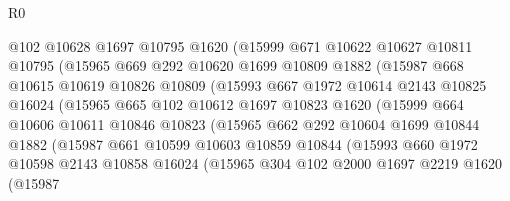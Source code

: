 \begin{lexlean}{R0}
\begin{coremodule}
                    @102
                    @10628
                    @1697
                    @10795
                    @1620
                    (@15999
                      @671
                      @10622
                      @10627
                      @10811
                      @10795
                      (@15965
                        @669
                        @292
                        @10620
                        @1699
                        @10809
                        @1882
                        (@15987
                          @668
                          @10615
                          @10619
                          @10826
                          @10809
                          (@15993
                            @667
                            @1972
                            @10614
                            @2143
                            @10825
                            @16024
                            (@15965
                              @665
                              @102
                              @10612
                              @1697
                              @10823
                              @1620
                              (@15999
                                @664
                                @10606
                                @10611
                                @10846
                                @10823
                                (@15965
                                  @662
                                  @292
                                  @10604
                                  @1699
                                  @10844
                                  @1882
                                  (@15987
                                    @661
                                    @10599
                                    @10603
                                    @10859
                                    @10844
                                    (@15993
                                      @660
                                      @1972
                                      @10598
                                      @2143
                                      @10858
                                      @16024
                                      (@15965
                                        @304
                                        @102
                                        @2000
                                        @1697
                                        @2219
                                        @1620
                                        (@15987

\end{coremodule}
\end{lexlean}
